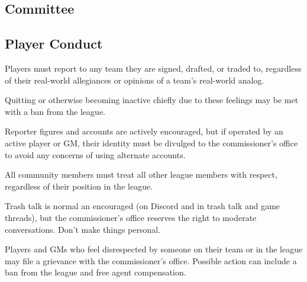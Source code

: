 \subsection{Committee}
\label{sec:Committee}
\begin{deepEnumerate}
	\item 
\end{deepEnumerate}

\subsection{Player Conduct}
\begin{deepEnumerate}
	\item Players must report to any team they are signed, drafted, or traded to,
	regardless of their real-world allegiances or opinions of a team's real-world analog.
	\begin{deepEnumerate}
		\item Quitting or otherwise becoming inactive 
		chiefly due to these feelings
		may be met with a ban from the league.
	\end{deepEnumerate}
	\item Reporter figures and accounts are actively encouraged,
	\label{sec:reporters}
	but if operated by an active player or GM,
	their identity must be divulged to the commissioner's office
	to avoid any concerns of using alternate accounts.
	\item All community members must treat all other league members with respect,
	regardless of their position in the league.
	\begin{deepEnumerate}
		\item Trash talk is normal an encouraged
		(on Discord and in trash talk and game threads),
		but the commissioner's office reserves the right to moderate conversations.
		Don't make things personal.
		\item Players and GMs who feel disrespected by someone on their team or in the league 
		may file a grievance with the commissioner's office.
		Possible action can include a ban from the league and free agent compensation.
	\end{deepEnumerate}
\end{deepEnumerate}
